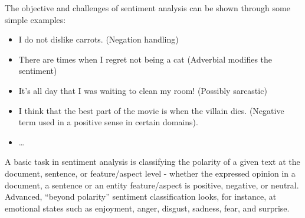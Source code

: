 The objective and challenges of sentiment analysis can be shown through some simple examples:
\begin{itemize}
	\item I do not dislike carrots. (Negation handling)
	\item There are times when I regret not being a cat (Adverbial modifies the sentiment)
	\item It's all day that I was waiting to clean my room! (Possibly sarcastic)
	\item I think that the best part of the movie is when the villain dies. (Negative term used in a positive sense in certain domains).
	\item \ldots
\end{itemize}

A basic task in sentiment analysis is classifying the polarity of a given text at the document, sentence, or feature/aspect level - whether the expressed opinion in a document, a sentence or an entity feature/aspect is positive, negative, or neutral. Advanced, “beyond polarity” sentiment classification looks, for instance, at emotional states such as enjoyment, anger, disgust, sadness, fear, and surprise.

